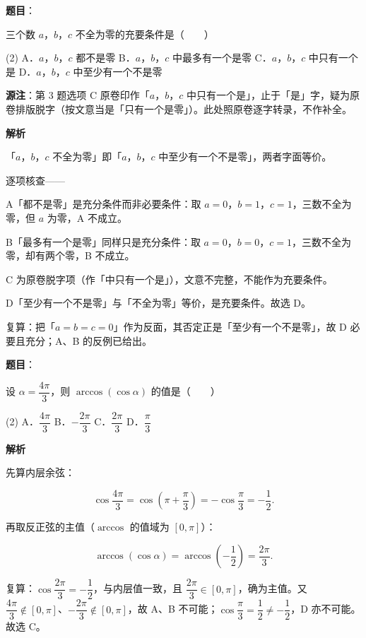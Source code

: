 \begin{answer}

\textbf{题目}：

三个数 $a$，$b$，$c$ 不全为零的充要条件是\mbox{（　　）}

\begin{gkopts}(2)
\task A．$a$，$b$，$c$ 都不是零
\task B．$a$，$b$，$c$ 中最多有一个是零
\task C．$a$，$b$，$c$ 中只有一个是
\task D．$a$，$b$，$c$ 中至少有一个不是零
\end{gkopts}

\begin{gktip}
\textbf{源注}：第 3 题选项 C 原卷印作「$a$，$b$，$c$ 中只有一个是」，止于「是」字，疑为原卷排版脱字（按文意当是「只有一个是零」）。此处照原卷逐字转录，不作补全。
\end{gktip}

\textbf{解析}

「$a$，$b$，$c$ 不全为零」即「$a$，$b$，$c$ 中至少有一个不是零」，两者字面等价。

逐项核查——

A「都不是零」是充分条件而非必要条件：取 $a=0$，$b=1$，$c=1$，三数不全为零，但 $a$ 为零，A 不成立。

B「最多有一个是零」同样只是充分条件：取 $a=0$，$b=0$，$c=1$，三数不全为零，却有两个零，B 不成立。

C 为原卷脱字项（作「中只有一个是」），文意不完整，不能作为充要条件。

D「至少有一个不是零」与「不全为零」等价，是充要条件。故选 D。

复算：把「$a=b=c=0$」作为反面，其否定正是「至少有一个不是零」，故 D 必要且充分；A、B 的反例已给出。


\end{answer}
\begin{answer}

\textbf{题目}：

设 $\alpha=\dfrac{4\pi}{3}$，则 $\arccos(\cos\alpha)$ 的值是\mbox{（　　）}

\begin{gkopts}(2)
\task A．$\dfrac{4\pi}{3}$
\task B．$-\dfrac{2\pi}{3}$
\task C．$\dfrac{2\pi}{3}$
\task D．$\dfrac{\pi}{3}$
\end{gkopts}

\textbf{解析}

先算内层余弦：

\nopagebreak[4]
\[
\cos\frac{4\pi}{3}=\cos\left(\pi+\frac{\pi}{3}\right)=-\cos\frac{\pi}{3}=-\frac12.
\]

再取反正弦的主值（$\arccos$ 的值域为 $[0,\pi]$）：

\nopagebreak[4]
\[
\arccos(\cos\alpha)=\arccos\left(-\frac12\right)=\frac{2\pi}{3}.
\]

复算：$\cos\dfrac{2\pi}{3}=-\dfrac12$，与内层值一致，且 $\dfrac{2\pi}{3}\in[0,\pi]$，确为主值。又 $\dfrac{4\pi}{3}\notin[0,\pi]$、$-\dfrac{2\pi}{3}\notin[0,\pi]$，故 A、B 不可能；$\cos\dfrac{\pi}{3}=\dfrac12\neq-\dfrac12$，D 亦不可能。故选 C。


\end{answer}
